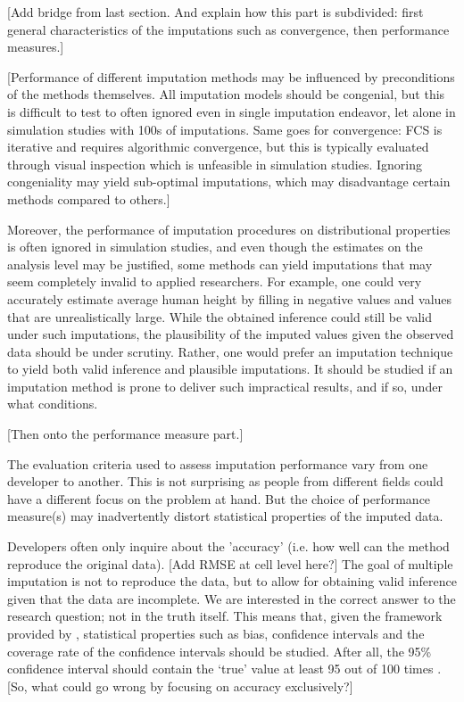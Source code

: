 \documentclass[bimj,fleqn]{w-art}
\theoremstyle{plain}
\theoremstyle{definition}
\begin{document}
[Add bridge from last section. And explain how this part is subdivided: first general characteristics of the imputations such as convergence, then performance measures.]

[Performance of different imputation methods may be influenced by preconditions of the methods themselves. All imputation models should be congenial, but this is difficult to test to often ignored even in single imputation endeavor, let alone in simulation studies with 100s of imputations. Same goes for convergence: FCS is iterative and requires algorithmic convergence, but this is typically evaluated through visual inspection which is unfeasible in simulation studies. Ignoring congeniality may yield sub-optimal imputations, which may disadvantage certain methods compared to others.]

Moreover, the performance of imputation procedures on distributional properties is often ignored in simulation studies, and even though the estimates on the analysis level may be justified, some methods can yield imputations that may seem completely invalid to applied researchers. For example, one could very accurately estimate average human height by filling in negative values and values that are unrealistically large. While the obtained inference could still be valid under such imputations, the plausibility of the imputed values given the observed data should be under scrutiny. Rather, one would prefer an imputation technique to yield both valid inference and plausible imputations. It should be studied if an imputation method is prone to deliver such impractical results, and if so, under what conditions.

[Then onto the performance measure part.]

The evaluation criteria used to assess imputation performance vary from one developer to another. This is not surprising as people from different fields could have a different focus on the problem at hand. But the choice of performance measure(s) may inadvertently distort statistical properties of the imputed data.

Developers often only inquire about the 'accuracy' (i.e. how well can the method reproduce the original data). [Add RMSE at cell level here?] The goal of multiple imputation is not to reproduce the data, but to allow for obtaining valid inference given that the data are incomplete. We are interested in the correct answer to the research question; not in the truth itself. This means that, given the framework provided by \citet{rubi87}, statistical properties such as bias, confidence intervals and the coverage rate of the confidence intervals should be studied. After all, the 95\% confidence interval should contain the `true' value at least 95 out of 100 times \citep[][p. 591]{neym34}. [So, what could go wrong by focusing on accuracy exclusively?]
\end{document}
